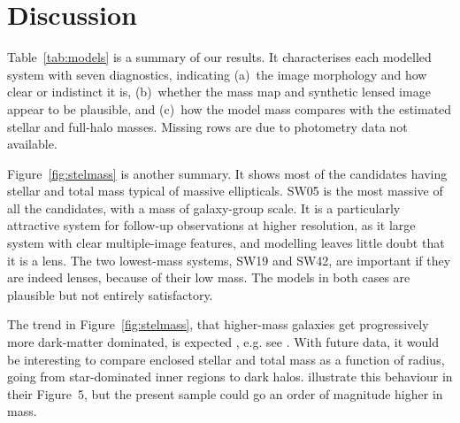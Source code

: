 \section{Discussion}\label{sec:summary}

Table~\ref{tab:models} is a summary of our results.  It characterises
each modelled system with seven diagnostics, indicating (a)~the image
morphology and how clear or indistinct it is, (b)~whether the mass map
and synthetic lensed image appear to be plausible, and (c)~how the
model mass compares with the estimated stellar and full-halo masses.
Missing rows are due to photometry data not available.

Figure~\ref{fig:stelmass} is another summary.  It shows most of the
candidates having stellar and total mass typical of massive
ellipticals.  SW05 is the most massive of all the candidates, with a
mass of galaxy-group scale.  It is a particularly attractive system
for follow-up observations at higher resolution, as it large system
with clear multiple-image features, and modelling leaves little doubt
that it is a lens.  The two lowest-mass systems, SW19 and SW42, are
important if they are indeed lenses, because of their low mass.  The
models in both cases are plausible but not entirely satisfactory.

The trend in Figure~\ref{fig:stelmass}, that higher-mass galaxies get
progressively more dark-matter dominated, is expected
, e.g. see \cite{2005ApJ...623L...5F}.
With future data, it would be interesting to compare enclosed
stellar and total mass as a function of radius, going from
star-dominated inner regions to dark halos.
\cite{2011ApJ...740...97L} illustrate this behaviour in their
Figure~5, but the present sample could go an order of magnitude higher
in mass.

